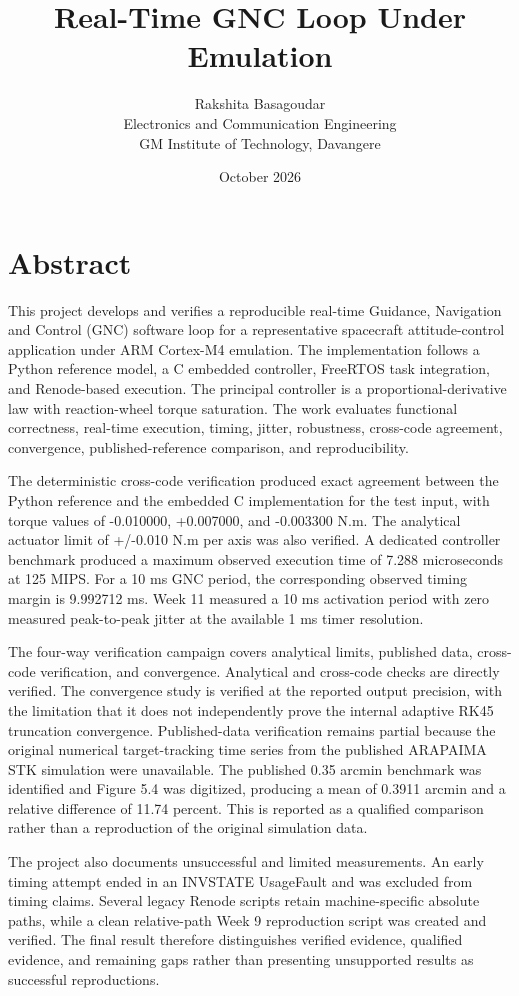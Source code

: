 \documentclass[11pt,a4paper]{article}
\title{Real-Time GNC Loop Under Emulation}
\author{Rakshita Basagoudar\\Electronics and Communication Engineering\\GM Institute of Technology, Davangere}
\date{October 2026}
\begin{document}
\onehalfspacing
\maketitle
\tableofcontents
\listoffigures
\listoftables
\newpage
\tableofcontents
\newpage
\section{Abstract}
This project develops and verifies a reproducible real-time Guidance, Navigation and Control (GNC) software loop for a representative spacecraft attitude-control application under ARM Cortex-M4 emulation. The implementation follows a Python reference model, a C embedded controller, FreeRTOS task integration, and Renode-based execution. The principal controller is a proportional-derivative law with reaction-wheel torque saturation. The work evaluates functional correctness, real-time execution, timing, jitter, robustness, cross-code agreement, convergence, published-reference comparison, and reproducibility.

The deterministic cross-code verification produced exact agreement between the Python reference and the embedded C implementation for the test input, with torque values of -0.010000, +0.007000, and -0.003300 N.m. The analytical actuator limit of +/-0.010 N.m per axis was also verified. A dedicated controller benchmark produced a maximum observed execution time of 7.288 microseconds at 125 MIPS. For a 10 ms GNC period, the corresponding observed timing margin is 9.992712 ms. Week 11 measured a 10 ms activation period with zero measured peak-to-peak jitter at the available 1 ms timer resolution.

The four-way verification campaign covers analytical limits, published data, cross-code verification, and convergence. Analytical and cross-code checks are directly verified. The convergence study is verified at the reported output precision, with the limitation that it does not independently prove the internal adaptive RK45 truncation convergence. Published-data verification remains partial because the original numerical target-tracking time series from the published ARAPAIMA STK simulation were unavailable. The published 0.35 arcmin benchmark was identified and Figure 5.4 was digitized, producing a mean of 0.3911 arcmin and a relative difference of 11.74 percent. This is reported as a qualified comparison rather than a reproduction of the original simulation data.

The project also documents unsuccessful and limited measurements. An early timing attempt ended in an INVSTATE UsageFault and was excluded from timing claims. Several legacy Renode scripts retain machine-specific absolute paths, while a clean relative-path Week 9 reproduction script was created and verified. The final result therefore distinguishes verified evidence, qualified evidence, and remaining gaps rather than presenting unsupported results as successful reproductions.
\end{document}
